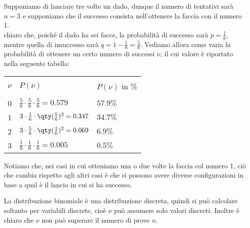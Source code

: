 \begin{esempio}
   Supponiamo di lanciare tre volte un dado, dunque il numero di tentativi sarà $n=3$ e supponiamo che il successo consista nell'ottenere la faccia con il numero 1.\\
   \E chiaro che, poiché il dado ha sei facce, la probabilità di successo sarà $p=\frac{1}{6}$, mentre quella di insuccesso sarà $q=1-\frac{1}{6}=\frac{5}{6}$. Vediamo allora come varia la probabilità di ottenere un certo numero di successi $\nu$, il cui valore è riportato nella seguente tabella:
   \begin{center}
      \begin{tabular}{|l|l|l|}
         \hline
         &&\\[-0.4cm]
         $\nu$ & $P(\nu)$ & $P(\nu)$ in \%\\[0.1cm]
         \hline
         &&\\[-0.4cm]
         0 & $\frac{5}{6} \cdot \frac{5}{6} \cdot \frac{5}{6}=0.579$ & $57.9\%$\\[0.2cm]
         1 & $3 \cdot \frac{1}{6} \cdot \qty(\frac{5}{6})^2=0.347$ & $34.7\%$\\[0.2cm]
         2 & $3 \cdot \frac{5}{6} \cdot \qty(\frac{1}{6})^2=0.069$ & $6.9\%$\\[0.2cm]
         3 & $\frac{1}{6} \cdot \frac{1}{6} \cdot \frac{1}{6}=0.005$ & $0.5\%$\\[0.2cm]
         \hline
      \end{tabular}
   \end{center}
   Notiamo che, nei casi in cui otteniamo una o due volte la faccia col numero 1, ciò che cambia rispetto agli altri casi è che si possono avere diverse configurazioni in base a qual è il lancio in cui si ha successo.
\end{esempio}

La distribuzione binomiale è una distribuzione discreta, quindi si può calcolare soltanto per variabili discrete, cioè $\nu$ può assumere solo valori discreti. Inoltre è chiaro che $\nu$ non può superare il numero di prove $n$. 

